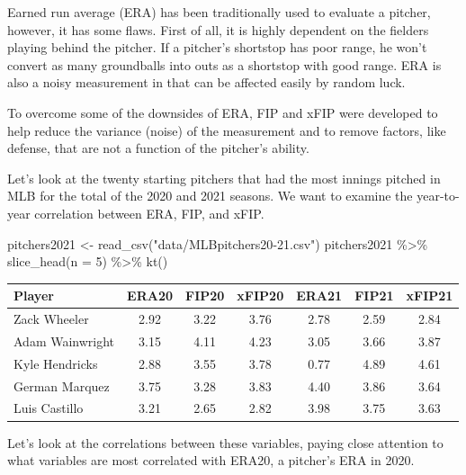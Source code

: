 \documentclass[
  11pt,
]{book}
\newenvironment{Shaded}{\begin{snugshade}}{\end{snugshade}}
\newcommand{\AttributeTok}[1]{\textcolor[rgb]{0.77,0.63,0.00}{#1}}
\newcommand{\DecValTok}[1]{\textcolor[rgb]{0.00,0.00,0.81}{#1}}
\newcommand{\FunctionTok}[1]{\textcolor[rgb]{0.00,0.00,0.00}{#1}}
\newcommand{\NormalTok}[1]{#1}
\newcommand{\OtherTok}[1]{\textcolor[rgb]{0.56,0.35,0.01}{#1}}
\newcommand{\SpecialCharTok}[1]{\textcolor[rgb]{0.00,0.00,0.00}{#1}}
\newcommand{\StringTok}[1]{\textcolor[rgb]{0.31,0.60,0.02}{#1}}
\theoremstyle{definition}
\theoremstyle{definition}
\theoremstyle{definition}
\theoremstyle{definition}
\theoremstyle{remark}
\begin{document}
Earned run average (ERA) has been traditionally used to evaluate a pitcher, however, it has some flaws. First of all, it is highly dependent on the fielders playing behind the pitcher. If a pitcher's shortstop has poor range, he won't convert as many groundballs into outs as a shortstop with good range. ERA is also a noisy measurement in that can be affected easily by random luck.

To overcome some of the downsides of ERA, FIP and xFIP were developed to help reduce the variance (noise) of the measurement and to remove factors, like defense, that are not a function of the pitcher's ability.

Let's look at the twenty starting pitchers that had the most innings pitched in MLB for the total of the 2020 and 2021 seasons. We want to examine the year-to-year correlation between ERA, FIP, and xFIP.

\begin{Shaded}
\begin{Highlighting}[]
\NormalTok{pitchers2021 }\OtherTok{\textless{}{-}} \FunctionTok{read\_csv}\NormalTok{(}\StringTok{"data/MLBpitchers20{-}21.csv"}\NormalTok{)}
\NormalTok{pitchers2021 }\SpecialCharTok{\%\textgreater{}\%}
    \FunctionTok{slice\_head}\NormalTok{(}\AttributeTok{n =} \DecValTok{5}\NormalTok{) }\SpecialCharTok{\%\textgreater{}\%}
    \FunctionTok{kt}\NormalTok{()}
\end{Highlighting}
\end{Shaded}

\begin{table}[H]
\centering
\begin{tabular}{l|c|c|c|c|c|c}
\hline
Player & ERA20 & FIP20 & xFIP20 & ERA21 & FIP21 & xFIP21\\
\hline
Zack Wheeler & 2.92 & 3.22 & 3.76 & 2.78 & 2.59 & 2.84\\
\hline
Adam Wainwright & 3.15 & 4.11 & 4.23 & 3.05 & 3.66 & 3.87\\
\hline
Kyle Hendricks & 2.88 & 3.55 & 3.78 & 0.77 & 4.89 & 4.61\\
\hline
German Marquez & 3.75 & 3.28 & 3.83 & 4.40 & 3.86 & 3.64\\
\hline
Luis Castillo & 3.21 & 2.65 & 2.82 & 3.98 & 3.75 & 3.63\\
\hline
\end{tabular}
\end{table}

\vfill
\newpage

Let's look at the correlations between these variables, paying close attention to what variables are most correlated with ERA20, a pitcher's ERA in 2020.
\end{document}
